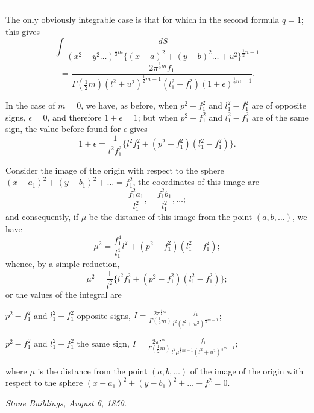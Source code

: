 \documentclass[11pt]{article}
\begin{document}
\vspace{0.5em}
\noindent\rule{\textwidth}{0.4pt}
\vspace{0.5em}

\noindent The only obviously integrable case is that for which in the second formula $q=1$; this gives
\[
\int \frac{dS}{(x^2+y^2\ldots)^{\frac{1}{2}m}\{(x-a)^2+(y-b)^2\ldots+u^2\}^{\frac{1}{2}n-1}}
\]
\[
= \frac{2\pi^{\frac{1}{2}m} f_1}{\Gamma(\frac{1}{2}m)(l^2+u^2)^{\frac{1}{2}m-1}(l_1^2-f_1^2)(1+\epsilon)^{\frac{1}{2}m-1}}.
\]

In the case of $m=0$, we have, as before, when $p^2-f_1^2$ and $l_1^2-f_1^2$ are of opposite signs, $\epsilon=0$, and therefore $1+\epsilon=1$; but when $p^2-f_1^2$ and $l_1^2-f_1^2$ are of the same sign, the value before found for $\epsilon$ gives
\[
1+\epsilon = \frac{1}{l^2 f_1^2} \{l^2 f_1^2 + (p^2-f_1^2)(l_1^2-f_1^2)\}.
\]

Consider the image of the origin with respect to the sphere $(x-a_1)^2 + (y-b_1)^2 + \ldots = f_1^2$, the coordinates of this image are
\[
\frac{f_1^2 a_1}{l_1^2}, \quad \frac{f_1^2 b_1}{l_1^2}, \ldots;
\]
and consequently, if $\mu$ be the distance of this image from the point $(a, b, \ldots)$, we have
\[
\mu^2 = \frac{f_1^4}{l_1^4} l^2 + (p^2-f_1^2)(l_1^2-f_1^2);
\]
whence, by a simple reduction,
\[
\mu^2 = \frac{1}{l^2}\{l^2 f_1^2 + (p^2-f_1^2)(l_1^2-f_1^2)\};
\]
or the values of the integral are

\begin{center}
$p^2-f_1^2$ and $l_1^2-f_1^2$ opposite signs, $\displaystyle I = \frac{2\pi^{\frac{1}{2}m}}{\Gamma(\frac{1}{2}m)} \frac{f_1}{l^2(l^2+u^2)^{\frac{1}{2}m-1}}$;
\end{center}
\begin{center}
$p^2-f_1^2$ and $l_1^2-f_1^2$ the same sign, $\displaystyle I = \frac{2\pi^{\frac{1}{2}m}}{\Gamma(\frac{1}{2}m)} \frac{f_1}{l^2 \mu^{\frac{1}{2}m-1}(l^2+u^2)^{\frac{1}{2}m-1}}$;
\end{center}

\vspace{0.3em}
\noindent where $\mu$ is the distance from the point $(a, b, \ldots)$ of the image of the origin with respect to the sphere $(x-a_1)^2 + (y-b_1)^2 + \ldots - f_1^2 = 0$.

\begin{flushright}
\textit{Stone Buildings, August 6, 1850.}
\end{flushright}

\newpage
\setcounter{page}{40}
\end{document}
